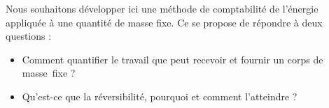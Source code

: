 Nous souhaitons développer ici une méthode de comptabilité de l’énergie appliquée à une quantité de masse fixe. Ce \coursdeux se propose de répondre à deux questions :
\begin{itemize}
	\item Comment quantifier le travail que peut recevoir et fournir un corps de masse~fixe ?
	\item Qu’est-ce que la réversibilité, pourquoi et comment l’atteindre ?
\end{itemize}
